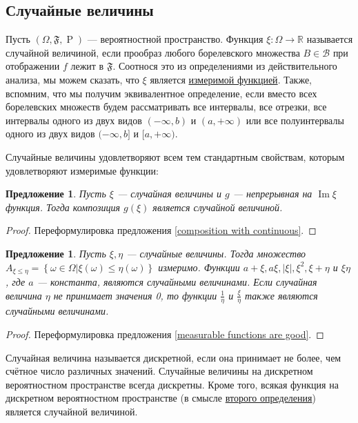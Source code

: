 \documentclass[12pt]{article}
\newtheorem{proposition}[theorem]{Предложение}
\numberwithin{theorem}{section}
\theoremstyle{definition}
\newcommand{\defin}[2]{\hypertarget{#2}{{\color{red} #1}}}
\newcommand{\RR}{\mathbb{R}}
\newcommand{\calB}{\mathcal{B}}
\newcommand{\prob}{\operatorname{P}}
\newcommand{\events}{\mathfrak{F}}
\newcommand{\Image}{\operatorname{Im}}
\newcommand{\defineset}[2]{\left\{
	\left.
	#1
	\right\vert
	#2
	\right\}}
\begin{document}
	\subsection{Случайные величины}
	
	Пусть $ (\Omega, \events, \prob) $ --- вероятностной пространство.
	Функция $ \xi \colon \Omega \to \RR $ называется \defin{случайной величиной}{random-variable},
	если прообраз любого борелевского множества $ B \in \calB $ при отображении $ f $
	лежит в $ \events $. Соотнося это из определениями из действительного анализа, 
	мы можем сказать, что $ \xi $ является \hyperlink{measurable-function}{измеримой функцией}.
	Также, вспомним, что мы получим эквивалентное определение,
	если вместо всех борелевских множеств будем рассматривать все интервалы, все отрезки,
	все интервалы одного из двух видов $ (-\infty, b) $ и $ (a, +\infty) $
	или все полуинтервалы одного из двух видов $ (-\infty, b] $ и $ [a, +\infty) $.
	
	Случайные величины удовлетворяют всем тем стандартным свойствам, 
	которым удовлетворяют измеримые функции:
	
	\begin{proposition} \label{random variebles composition with continuous}
		Пусть $ \xi $ --- случайная величины и $ g $ --- непрерывная на $ \Image \xi $ функция.
		Тогда композиция $ g(\xi) $ является случайной величиной.
	\end{proposition}
	
	\begin{proof}
		Переформулировка предложения \ref{composition with continuous}.
	\end{proof}
	
	\begin{proposition} \label{random variables are good}
		Пусть $ \xi, \eta $ --- случайные величины.
		Тогда множество $ A_{\xi \leqslant \eta} = \defineset{\omega \in \Omega}{\xi(\omega) \leqslant \eta(\omega)} $
		измеримо.
		Функции $ a + \xi, a\xi, |\xi|, \xi^2, \xi + \eta $ и $ \xi\eta $, где $ a $ --- константа, являются случайными величинами.
		Если случайная величина $ \eta $ не принимает значения 0, то функции $ \tfrac{1}{\eta} $ и $ \tfrac{\xi}{\eta} $
		также являются случайными величинами.
	\end{proposition}
	
	\begin{proof}
		Переформулировка предложения \ref{measurable functions are good}.
	\end{proof}
	
	Случайная величина называется \defin{дискретной}{discrete-random-variable}, 
	если она принимает не более, чем счётное число различных значений.
	Случайные величины на дискретном вероятностном пространстве всегда дискретны.
	Кроме того, всякая функция на дискретном вероятностном пространстве (в смысле \hyperlink{discr-2}{второго определения})
	является случайной величиной.
	
\end{document}

